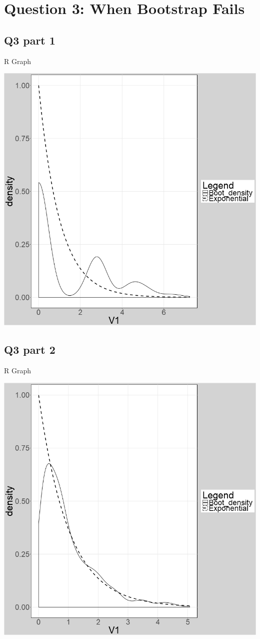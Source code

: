 \documentclass[11pt]{article}
\begin{document}

\section{Question 3: When Bootstrap Fails}
\subsection{Q3 part 1}
\centerline{R Graph }
\begin{center}
	\includegraphics[width=.8\linewidth]{plot_q3_1.png}	
\end{center}


\subsection{Q3 part 2}
\centerline{R Graph }
\begin{center}
	\includegraphics[width=.8\linewidth]{plot_q3_2.png}	
\end{center}
\end{document}
